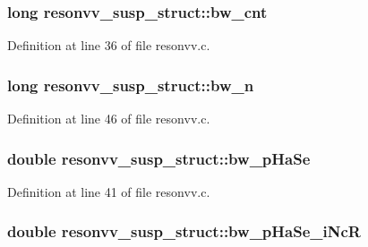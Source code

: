 \subsubsection[{\texorpdfstring{bw\+\_\+cnt}{bw_cnt}}]{\setlength{\rightskip}{0pt plus 5cm}long resonvv\+\_\+susp\+\_\+struct\+::bw\+\_\+cnt}\hypertarget{structresonvv__susp__struct_ad9f09d7b337264caa9a374cd527b8a3b}{}\label{structresonvv__susp__struct_ad9f09d7b337264caa9a374cd527b8a3b}


Definition at line 36 of file resonvv.\+c.

\subsubsection[{\texorpdfstring{bw\+\_\+n}{bw_n}}]{\setlength{\rightskip}{0pt plus 5cm}long resonvv\+\_\+susp\+\_\+struct\+::bw\+\_\+n}\hypertarget{structresonvv__susp__struct_a9b9bba761ce472ae0032241dc456085a}{}\label{structresonvv__susp__struct_a9b9bba761ce472ae0032241dc456085a}


Definition at line 46 of file resonvv.\+c.

\subsubsection[{\texorpdfstring{bw\+\_\+p\+Ha\+Se}{bw_pHaSe}}]{\setlength{\rightskip}{0pt plus 5cm}double resonvv\+\_\+susp\+\_\+struct\+::bw\+\_\+p\+Ha\+Se}\hypertarget{structresonvv__susp__struct_a0063131c1fcd607ea209629bf2af02fd}{}\label{structresonvv__susp__struct_a0063131c1fcd607ea209629bf2af02fd}


Definition at line 41 of file resonvv.\+c.

\subsubsection[{\texorpdfstring{bw\+\_\+p\+Ha\+Se\+\_\+i\+NcR}{bw_pHaSe_iNcR}}]{\setlength{\rightskip}{0pt plus 5cm}double resonvv\+\_\+susp\+\_\+struct\+::bw\+\_\+p\+Ha\+Se\+\_\+i\+NcR}\hypertarget{structresonvv__susp__struct_a6fc75f5e5355cd3df2999d3e7e12fc36}{}\label{structresonvv__susp__struct_a6fc75f5e5355cd3df2999d3e7e12fc36}


